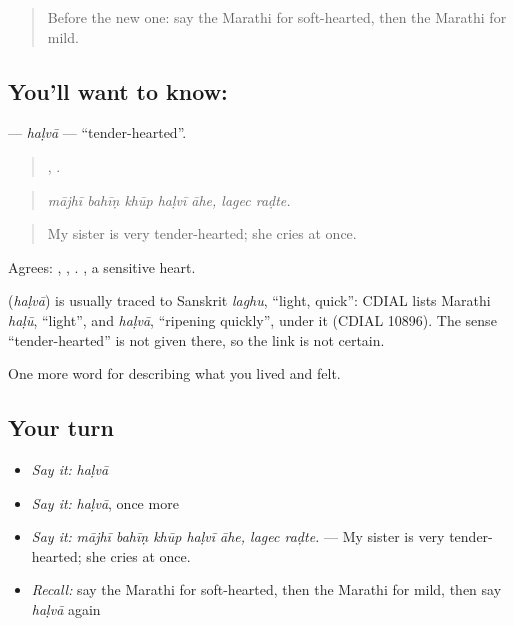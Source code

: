 \begin{quote}
Before the new one: say the Marathi for soft-hearted, then the Marathi for mild.
\end{quote}

\subsection*{You'll want to know: }
\textbf{} — \emph{haḷvā} — \textquotedblleft{}tender-hearted\textquotedblright{}.

\begin{quote}
    ,  .
\end{quote}

\begin{quote}
\emph{mājhī bahīṇ khūp haḷvī āhe, lagec raḍte.}
\end{quote}

\begin{quote}
My sister is very tender-hearted; she cries at once.
\end{quote}

Agrees: , , .  , a sensitive heart.

\begin{cousinweb}
\textbf{} (\emph{haḷvā}) is usually traced to Sanskrit \emph{laghu}, \textquotedblleft{}light, quick\textquotedblright{}: CDIAL lists Marathi \emph{haḷū}, \textquotedblleft{}light\textquotedblright{}, and \emph{haḷvā}, \textquotedblleft{}ripening quickly\textquotedblright{}, under it (CDIAL 10896). The sense \textquotedblleft{}tender-hearted\textquotedblright{} is not given there, so the link is not certain.
\end{cousinweb}

\begin{grammarlens}[title={What you've built}]
One more word for describing what you lived and felt.
\end{grammarlens}

\subsection*{Your turn}
\begin{itemize}
\raggedright
  \item \emph{Say it:} \emph{haḷvā}
  \item \emph{Say it:} \emph{haḷvā}, once more
  \item \emph{Say it:} \emph{mājhī bahīṇ khūp haḷvī āhe, lagec raḍte.} — My sister is very tender-hearted; she cries at once.
  \item \emph{Recall:} say the Marathi for soft-hearted, then the Marathi for mild, then say \emph{haḷvā} again
\end{itemize}

